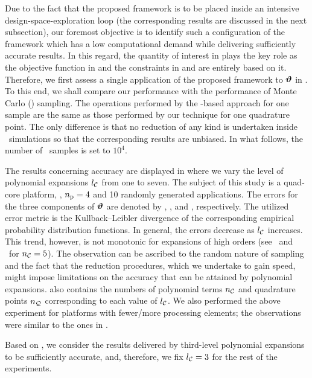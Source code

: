 Due to the fact that the proposed framework is to be placed inside an intensive design-space-exploration loop (the corresponding results are discussed in the next subsection), our foremost objective is to identify such a configuration of the framework which has a low computational demand while delivering sufficiently accurate results.
In this regard, the quantity of interest in  plays the key role as the objective function in  and the constraints in  and  are entirely based on it.
Therefore, we first assess a single application of the proposed framework to $\bm{\vartheta}$ in .
To this end, we shall compare our performance with the performance of Monte Carlo (\MC) sampling.
The operations performed by the \MC-based approach for one sample are the same as those performed by our technique for one quadrature point.
The only difference is that no reduction of any kind is undertaken inside \MC\ simulations so that the corresponding results are unbiased.
In what follows, the number of \MC\ samples is set to $10^4$.


The results concerning accuracy are displayed in  where we vary the level of polynomial expansions ${l_\mathcal{C}}$ from one to seven.
The subject of this study is a quad-core platform, \ie, ${n_\text{p}} = 4$ and 10 randomly generated applications.
The errors for the three components of $\bm{\vartheta}$ are denoted by \errorE, \errorQ, and \errorT, respectively.
The utilized error metric is the Kullback--Leibler divergence of the corresponding empirical probability distribution functions.
In general, the errors decrease as ${l_\mathcal{C}}$ increases.
This trend, however, is not monotonic for expansions of high orders (see \errorQ\ and \errorT\ for ${n_\mathcal{C}} = 5$).
The observation can be ascribed to the random nature of sampling and the fact that the reduction procedures, which we undertake to gain speed, might impose limitations on the accuracy that can be attained by polynomial expansions.
 also contains the numbers of polynomial terms ${n_\mathcal{C}}$ and quadrature points ${n_\mathcal{Q}}$ corresponding to each value of ${l_\mathcal{C}}$.
We also performed the above experiment for platforms with fewer/more processing elements; the observations were similar to the ones in .

Based on , we consider the results delivered by third-level polynomial expansions to be sufficiently accurate, and, therefore, we fix ${l_\mathcal{C}} = 3$ for the rest of the experiments.

